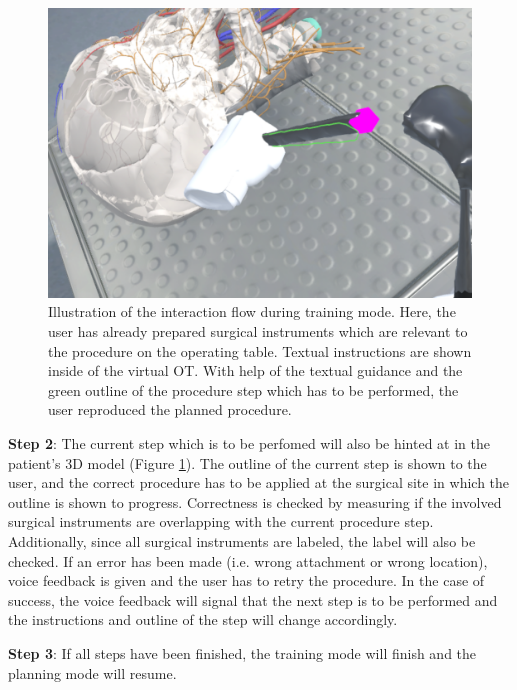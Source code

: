 \begin{figure}
\begin{minipage}{0.5\textwidth}
    \end{minipage}%
    \begin{minipage}{0.5\textwidth}
      \centering
      \includegraphics[width=0.997\linewidth]{images/implementation/features/training/train_4.png}
  \end{minipage}%
    \caption{\label{fig::TrainingMode}Illustration of the interaction flow during training mode. Here, the user has already prepared surgical instruments which are relevant to the procedure on the operating table. Textual instructions are shown inside of the virtual OT. With help of the textual guidance and the green outline of the procedure step which has to be performed, the user reproduced the planned procedure.}
  \end{figure}

\textbf{Step 2}: The current step which is to be perfomed will also be hinted at in the patient's 3D model (Figure \ref{fig::TrainingMode}).
The outline of the current step is shown to the user, and the correct procedure has to be applied at the surgical site in which the outline is shown to progress.
Correctness is checked by measuring if the involved surgical instruments are overlapping with the current procedure step.
Additionally, since all surgical instruments are labeled, the label will also be checked.
If an error has been made (i.e. wrong attachment or wrong location), voice feedback is given and the user has to retry the procedure.
In the case of success, the voice feedback will signal that the next step is to be performed and the instructions and outline of the step will change accordingly.

\textbf{Step 3}: If all steps have been finished, the training mode will finish and the planning mode will resume.
